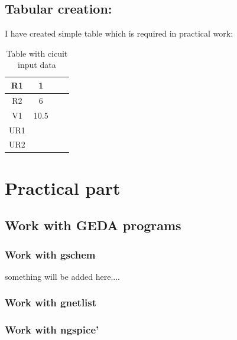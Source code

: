 \documentclass{report}
\begin{document}
 \section{Tabular creation:}
 I have created simple table which is required in practical work:
 
\begin{table}[!tb]
    \begin{center}
        \begin{tabular}{ |c|c|c|c| } 
            \hline
            R1  & 1 \\ 
            \hline
            R2 & 6 \\ 
            \hline
            V1 & 10.5 \\ 
            \hline
            UR1 & \\ 
            \hline
            UR2 & \\ 
            \hline
        \end{tabular}
        \caption{Table with cicuit input data}
    \end{center}
\end{table}
 
 \chapter{Practical part}
\section{Work with GEDA programs} 
\subsection{Work with gschem}
    something will be added here....

\subsection{ Work with gnetlist}
 

 
 \subsection{Work with ngspice’}
 
\end{document}
